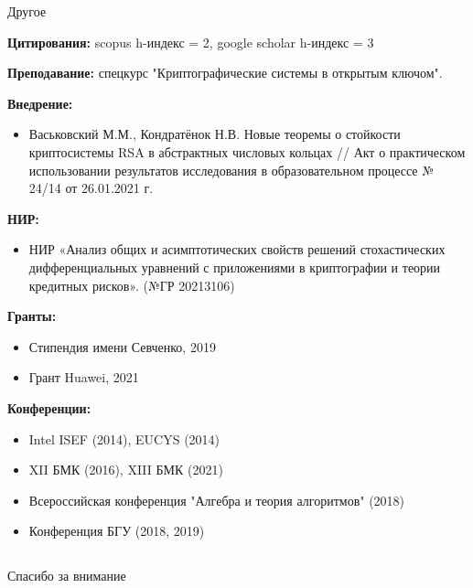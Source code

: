 \documentclass[8pt, xcolor=x11names]{beamer}
\begin{document}
\begin{frame}{Другое}
    \begin{small}
        {\bf Цитирования:} scopus h-индекс = 2, google scholar h-индекс = 3
        
        {\bf Преподавание:} спецкурс "Криптографические системы в открытым ключом".

        {\bf Внедрение:}
        \begin{itemize}
            \item Васьковский М.М., Кондратёнок Н.В. Новые теоремы о стойкости криптосистемы RSA в абстрактных числовых кольцах // Акт о практическом использовании результатов исследования в образовательном процессе № 24/14 от 26.01.2021 г.
        \end{itemize}
    
        {\bf НИР:}
        \begin{itemize}
            \item НИР «Анализ общих и асимптотических свойств решений стохастических дифференциальных уравнений с приложениями в криптографии и теории кредитных рисков». (№ГР 20213106)
        \end{itemize}
    
        {\bf Гранты:}
        \begin{itemize}
            \item Стипендия имени Севченко, 2019
    
            \item Грант Huawei, 2021
        \end{itemize}
        
        {\bf Конференции:}
        \begin{itemize}
            \item Intel ISEF (2014), EUCYS (2014)
            
            \item XII БМК (2016), XIII БМК (2021)
    
            \item Всероссийская конференция "Алгебра и теория алгоритмов" (2018)
    
            \item Конференция БГУ (2018, 2019)
        \end{itemize}
    \end{small}
\end{frame}

\subsection{}

\begin{frame}
    \begin{center}
        \begin{huge}
            Спасибо за внимание
        \end{huge}
    \end{center}
\end{frame}
\end{document}
